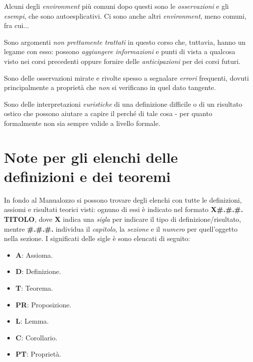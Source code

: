 \noindent Alcuni degli \textit{environment} più comuni dopo questi sono le \textit{osservazioni} e gli \textit{esempi}, che sono autoesplicativi. Ci sono anche altri \textit{environment}, meno comuni, fra cui...
\begin{digression}
	Sono argomenti \textit{non prettamente trattati} in questo corso che, tuttavia, hanno un legame con esso: possono \textit{aggiungere informazioni} e punti di vista a qualcosa visto nei corsi precedenti oppure fornire delle \textit{anticipazioni} per dei corsi futuri.
\end{digression}
\begin{attention}
	Sono delle osservazioni mirate e rivolte spesso a segnalare \textit{errori} frequenti, dovuti principalmente a proprietà che \textit{non} si verificano in quel dato tangente. 
\end{attention}
\begin{intuit}
	Sono delle interpretazioni \textit{euristiche} di una definizione difficile o di un risultato ostico che possono aiutare a capire il perché di tale cosa - per quanto formalmente non sia sempre valide a livello formale. 
\end{intuit}
\section*{Note per gli elenchi delle definizioni e dei teoremi}
In fondo al Manualozzo si possono trovare degli elenchi con tutte le definizioni, assiomi e risultati teorici visti: ognuno di essi è indicato nel formato \textbf{\textsc{X\#.\#.\#. TITOLO}}, dove \textbf{\textsc{X}} indica una \textit{sigla} per indicare il tipo di definizione/risultato, mentre \textbf{\textsc{\#.\#.\#.}} individua il \textit{capitolo}, la \textit{sezione} e il \textit{numero} per quell'oggetto nella sezione. I significati delle sigle è sono elencati di seguito:
\begin{multicols}{2}
	\begin{itemize}
		\item \textbf{\textsc{A}}: Assioma.
		\item \textbf{\textsc{D}}: Definizione.
		\item \textbf{\textsc{T}}: Teorema.
		\item \textbf{\textsc{PR}}: Proposizione.
		\item \textbf{\textsc{L}}: Lemma.
		\item \textbf{\textsc{C}}: Corollario.
		\item \textbf{\textsc{PT}}: Proprietà.
	\end{itemize}
\end{multicols}


